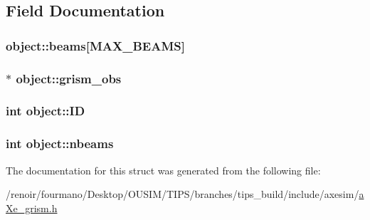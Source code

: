 \subsection{Field Documentation}
\hypertarget{structobject_ad643757142781f8265b430e19700cfe5}{
\subsubsection[{beams}]{ {\bf object::beams}\mbox{[}MAX\_\-BEAMS\mbox{]}}}
\label{structobject_ad643757142781f8265b430e19700cfe5}
\hypertarget{structobject_a90d2a68e430a65d8b022b7abd9491e3e}{
\subsubsection[{grism\_\-obs}]{$\ast$ {\bf object::grism\_\-obs}}}
\label{structobject_a90d2a68e430a65d8b022b7abd9491e3e}
\hypertarget{structobject_a8575880bdfc1c0bf44914b4efd2665bf}{
\subsubsection[{ID}]{\setlength{\rightskip}{0pt plus 5cm}int {\bf object::ID}}}
\label{structobject_a8575880bdfc1c0bf44914b4efd2665bf}
\hypertarget{structobject_a14120e3b048a2118f7acd75ea1571c60}{
\subsubsection[{nbeams}]{\setlength{\rightskip}{0pt plus 5cm}int {\bf object::nbeams}}}
\label{structobject_a14120e3b048a2118f7acd75ea1571c60}


The documentation for this struct was generated from the following file:\begin{DoxyCompactItemize}
\item 
/renoir/fourmano/Desktop/OUSIM/TIPS/branches/tips\_\-build/include/axesim/\hyperlink{aXe__grism_8h}{aXe\_\-grism.h}\end{DoxyCompactItemize}
